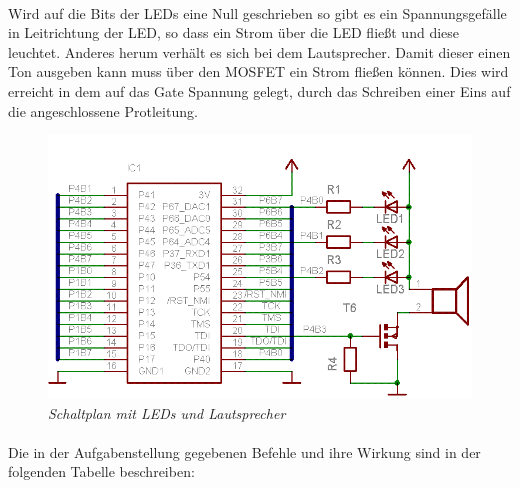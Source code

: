 \paragraph*{}
Wird auf die Bits der LEDs eine Null geschrieben so gibt es ein 
Spannungsgefälle in Leitrichtung der LED, so dass ein Strom über die LED 
fließt und diese leuchtet. Anderes herum verhält es sich bei dem 
Lautsprecher. Damit dieser einen Ton ausgeben kann muss über den MOSFET
ein Strom fließen können. Dies wird erreicht in dem auf das Gate Spannung 
gelegt, durch das Schreiben einer Eins auf die angeschlossene Protleitung.

\begin{figure}
\centering
\includegraphics[width=\textwidth]{img/mikrocontrollerUNDled.png}
\caption{\em \small Schaltplan mit LEDs und Lautsprecher}
\end{figure}

\paragraph{} Die in der Aufgabenstellung gegebenen Befehle und 
ihre Wirkung sind in der folgenden Tabelle beschreiben:


\lstset{
	frame=none,
	}

